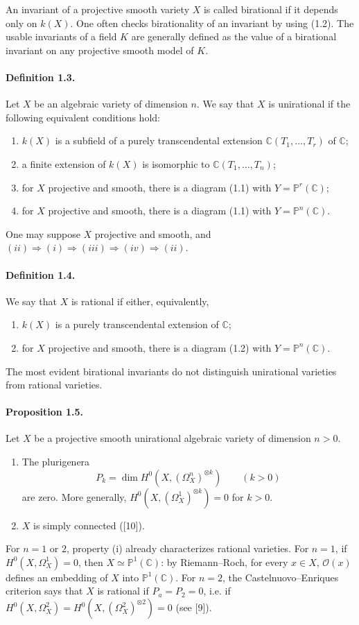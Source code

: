 \documentclass[10pt]{article}
\newcommand{\C}{\mathbb C}
\newcommand{\Pj}{\mathbb P}
\newcommand{\cO}{\mathcal O}
\begin{document}
An invariant of a projective smooth variety \(X\) is called birational if it depends only on \(k(X)\). One often checks birationality of an invariant by using (1.2). The usable invariants of a field \(K\) are generally defined as the value of a birational invariant on any projective smooth model of \(K\).

\paragraph{Definition 1.3.} Let \(X\) be an algebraic variety of dimension \(n\). We say that \(X\) is unirational if the following equivalent conditions hold:
\begin{enumerate}[label=(\roman*)]
\item \(k(X)\) is a subfield of a purely transcendental extension \(\C(T_1,\ldots,T_r)\) of \(\C\);
\item a finite extension of \(k(X)\) is isomorphic to \(\C(T_1,\ldots,T_n)\);
\item for \(X\) projective and smooth, there is a diagram (1.1) with \(Y=\Pj^r(\C)\);
\item for \(X\) projective and smooth, there is a diagram (1.1) with \(Y=\Pj^n(\C)\).
\end{enumerate}
One may suppose \(X\) projective and smooth, and \((ii)\Rightarrow(i)\Rightarrow(iii)\Rightarrow(iv)\Rightarrow(ii)\).

\paragraph{Definition 1.4.} We say that \(X\) is rational if either, equivalently,
\begin{enumerate}[label=(\roman*)]
\item \(k(X)\) is a purely transcendental extension of \(\C\);
\item for \(X\) projective and smooth, there is a diagram (1.2) with \(Y=\Pj^n(\C)\).
\end{enumerate}

The most evident birational invariants do not distinguish unirational varieties from rational varieties.

\paragraph{Proposition 1.5.} Let \(X\) be a projective smooth unirational algebraic variety of dimension \(n>0\).
\begin{enumerate}[label=(\roman*)]
\item The plurigenera
\[
P_k=\dim H^0(X,(\Omega_X^n)^{\otimes k})\qquad(k>0)
\]
are zero. More generally, \(H^0(X,(\Omega_X^1)^{\otimes k})=0\) for \(k>0\).
\item \(X\) is simply connected ([10]).
\end{enumerate}
For \(n=1\) or \(2\), property (i) already characterizes rational varieties. For \(n=1\), if \(H^0(X,\Omega_X^1)=0\), then \(X\simeq\Pj^1(\C)\): by Riemann--Roch, for every \(x\in X\), \(\cO(x)\) defines an embedding of \(X\) into \(\Pj^1(\C)\). For \(n=2\), the Castelnuovo--Enriques criterion says that \(X\) is rational if \(P_a=P_2=0\), i.e. if \(H^0(X,\Omega_X^2)=H^0(X,(\Omega_X^2)^{\otimes2})=0\) (see [9]).
\end{document}
